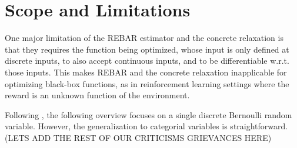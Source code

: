 \documentclass{article}
\begin{document}


\section{Scope and Limitations}
\label{limitations}
One major limitation of the REBAR estimator and the concrete relaxation is that they requires the function being optimized, whose input is only defined at discrete inputs, to also accept continuous inputs, and to be differentiable w.r.t. those inputs.
This makes REBAR and the concrete relaxation inapplicable for optimizing black-box functions, as in reinforcement learning settings where the reward is an unknown function of the environment.

Following \cite{tucker2017rebar}, the following overview focuses on a single discrete Bernoulli random variable.
However, the generalization to categorial variables is straightforward.
(LETS ADD THE REST OF OUR CRITICISMS GRIEVANCES HERE)
\end{document}
